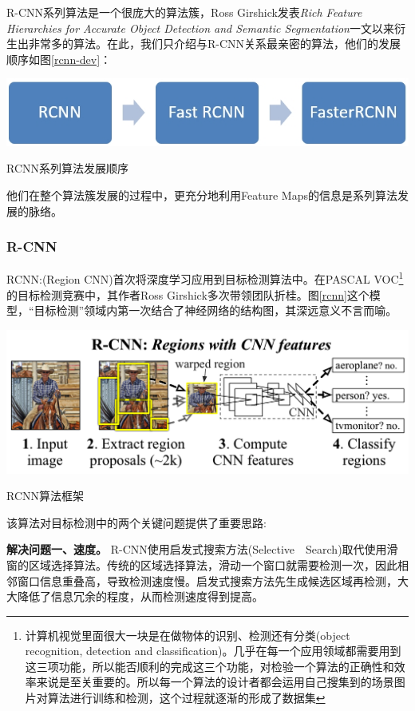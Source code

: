 R-CNN系列算法是一个很庞大的算法簇，Ross Girshick发表\textit{Rich Feature Hierarchies for Accurate Object Detection and Semantic Segmentation}\cite{rcnn}一文以来衍生出非常多的算法。在此，我们只介绍与R-CNN关系最亲密的算法，他们的发展顺序如图\ref{rcnn-dev}：
\begin{uscfigure}
	\includegraphics[width=\textwidth]{./Pictures/rcnn.jpg}	
	\caption{RCNN系列算法发展顺序}
	\label{rcnn-dev}
\end{uscfigure}

\par \noindent
他们在整个算法簇发展的过程中，更充分地利用Feature Maps的信息是系列算法发展的脉络。
\subsubsection{R-CNN}
RCNN:(Region CNN)\cite{rcnn}首次将深度学习应用到目标检测算法中。在PASCAL VOC\footnote{计算机视觉里面很大一块是在做物体的识别、检测还有分类(object recognition, detection and classification)。几乎在每一个应用领域都需要用到这三项功能，所以能否顺利的完成这三个功能，对检验一个算法的正确性和效率来说是至关重要的。所以每一个算法的设计者都会运用自己搜集到的场景图片对算法进行训练和检测，这个过程就逐渐的形成了数据集}的目标检测竞赛中，其作者Ross Girshick多次带领团队折桂。图\ref{rcnn}这个模型，“目标检测”领域内第一次结合了神经网络的结构图，其深远意义不言而喻。
\begin{uscfigure}
	\includegraphics[width=\textwidth]{./Pictures/rcnn-regions_with_cnn_features.png}	
	\caption{RCNN算法框架}
	\label{rcnn}
\end{uscfigure}
该算法对目标检测中的两个关键问题提供了重要思路:

\textbf{解决问题一、速度。}
R-CNN使用启发式搜索方法(Selective　Search\cite{ss})取代使用滑窗的区域选择算法。传统的区域选择算法，滑动一个窗口就需要检测一次，因此相邻窗口信息重叠高，导致检测速度慢。启发式搜索方法先生成候选区域再检测，大大降低了信息冗余的程度，从而检测速度得到提高。

